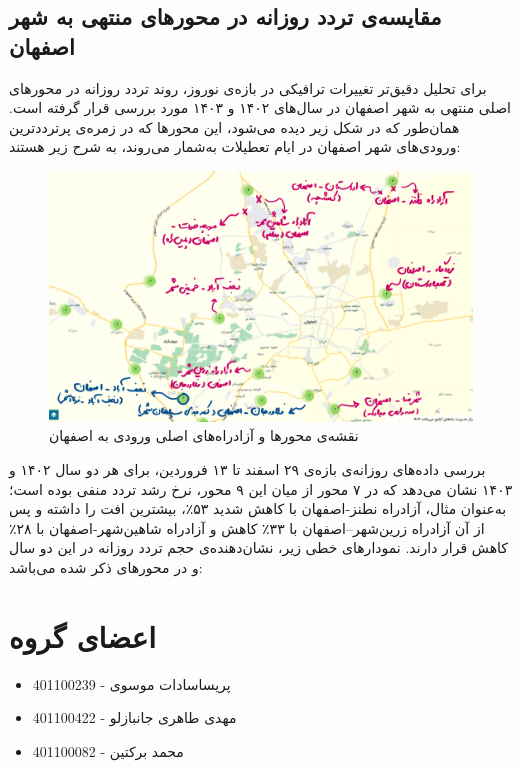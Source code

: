 \documentclass[a4paper, 12pt]{article}
\begin{document}
\subsection{مقایسه‌ی تردد روزانه در محورهای منتهی به شهر اصفهان}
برای تحلیل دقیق‌تر تغییرات ترافیکی در بازه‌ی نوروز، روند تردد روزانه در محورهای اصلی منتهی به شهر اصفهان در سال‌های ۱۴۰۲ و ۱۴۰۳ مورد بررسی قرار گرفته است. همان‌طور که در شکل زیر دیده می‌شود، این محورها که در زمره‌ی پرترددترین ورودی‌های شهر اصفهان در ایام تعطیلات به‌شمار می‌روند، به شرح زیر هستند:
\begin{figure}[htbp]
    \centering
    \includegraphics[width=1\textwidth]{isfahan_141.png}
    \caption{نقشه‌ی محورها و آزادراه‌های اصلی ورودی به اصفهان}
\end{figure}


بررسی داده‌های روزانه‌ی بازه‌ی ۲۹ اسفند تا ۱۳ فروردین، برای هر دو سال ۱۴۰۲ و ۱۴۰۳ نشان می‌دهد که در ۷ محور از میان این ۹ محور، نرخ رشد تردد منفی بوده است؛ به‌عنوان مثال، آزادراه نطنز-اصفهان با کاهش شدید ۵۳٪، بیشترین افت را داشته و پس از آن آزادراه زرین‌شهر–اصفهان با ۳۳٪ کاهش و آزادراه شاهین‌شهر-اصفهان با ۲۸٪ کاهش قرار دارند. نمودارهای خطی زیر، نشان‌دهنده‌ی حجم تردد روزانه در این دو سال و در محورهای ذکر شده می‌باشد:

\section{اعضای گروه}
\begin{itemize}
    \item پریساسادات موسوی - 401100239
    \item مهدی طاهری جانبازلو - 401100422
    \item محمد برکتین - 401100082
\end{itemize}
\end{document}
